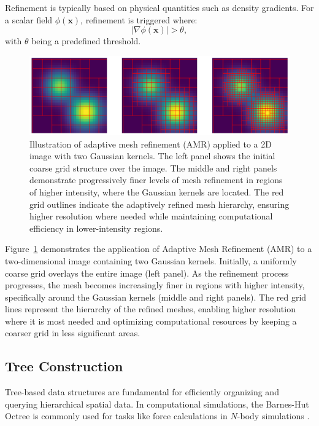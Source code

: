 Refinement is typically based on physical quantities such as density gradients. For a scalar field $\phi(\mathbf{x})$, refinement is triggered where:
\begin{equation}
    \left| \nabla \phi(\mathbf{x}) \right| > \theta,
\end{equation}
with $\theta$ being a predefined threshold.
\begin{figure}
    \centering
    \includegraphics[width=\textwidth]{figures/adaptive_mesh_refinement.png}
    \caption{Illustration of adaptive mesh refinement (AMR) applied to a 2D image with two Gaussian kernels. The left panel shows the initial coarse grid structure over the image. The middle and right panels demonstrate progressively finer levels of mesh refinement in regions of higher intensity, where the Gaussian kernels are located. The red grid outlines indicate the adaptively refined mesh hierarchy, ensuring higher resolution where needed while maintaining computational efficiency in lower-intensity regions.}
    \label{fig:amr}
\end{figure}
Figure~\ref{fig:amr} demonstrates the application of Adaptive Mesh Refinement (AMR) to a two-dimensional image containing two Gaussian kernels. Initially, a uniformly coarse grid overlays the entire image (left panel). As the refinement process progresses, the mesh becomes increasingly finer in regions with higher intensity, specifically around the Gaussian kernels (middle and right panels). The red grid lines represent the hierarchy of the refined meshes, enabling higher resolution where it is most needed and optimizing computational resources by keeping a coarser grid in less significant areas.

\subsection{Tree Construction}

Tree-based data structures are fundamental for efficiently organizing and querying hierarchical spatial data. In computational simulations, the Barnes-Hut Octree is commonly used for tasks like force calculations in $N$-body simulations \citep{1986Natur.324..446B}.

